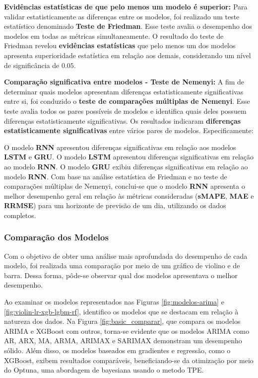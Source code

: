 \noindent\textbf{Evidências estatísticas de que pelo menos um modelo é superior:}
Para validar estatisticamente as diferenças entre os modelos, foi realizado um teste estatístico denominado \textbf{Teste de Friedman}. Esse teste avalia o desempenho dos modelos em todas as métricas simultaneamente. O resultado do teste de Friedman revelou \textbf{evidências estatísticas} que pelo menos um dos modelos apresenta superioridade estatística em relação aos demais, considerando um nível de significância de $0.05$.

\noindent\textbf{Comparação significativa entre modelos - Teste de Nemenyi:}	
A fim de determinar quais modelos apresentam diferenças estatisticamente significativas entre si, foi conduzido o \textbf{teste de comparações múltiplas de Nemenyi}. Esse teste avalia todos os pares possíveis de modelos e identifica quais deles possuem diferenças estatisticamente significativas. Os resultados indicaram \textbf{diferenças estatisticamente significativas} entre vários pares de modelos. Especificamente:

O modelo \textbf{RNN} apresentou diferenças significativas em relação aos modelos \textbf{LSTM} e \textbf{GRU}.
O modelo \textbf{LSTM} apresentou diferenças significativas em relação ao modelo \textbf{RNN}.
O modelo \textbf{GRU} exibiu diferenças significativas em relação ao modelo \textbf{RNN}.
Com base na análise estatística de Friedman e no teste de comparações múltiplas de Nemenyi, conclui-se que o modelo \textbf{RNN} apresenta o melhor desempenho geral em relação às métricas consideradas (\textbf{sMAPE}, \textbf{MAE} e \textbf{RRMSE}) para um horizonte de previsão de um dia, utilizando os dados completos.


\subsubsection{Compara\c c\~ao dos Modelos}

Com o objetivo de obter uma análise mais aprofundada do desempenho de cada modelo, foi realizada uma comparação por meio de um gráfico de violino e de barra. Dessa forma, pôde-se observar qual dos modelos apresentava o melhor desempenho.



Ao examinar os modelos representados nas Figuras \ref{fig:modelos-arima} e \ref{fig:violin-lr-xgb-lgbm-rf}, identifico os modelos que se destacam em relação à natureza dos dados. Na Figura \ref{fig:basic_comparar}, que compara os modelos ARIMA e XGBoost com outros, torna-se evidente que os modelos ARIMA como AR, ARX, MA, ARMA, ARIMAX e SARIMAX demonstram um desempenho sólido. Além disso, os modelos baseados em gradientes e regressão, como o XGBoost, exibem resultados comparáveis, beneficiando-se da otimização por meio do Optuna, uma abordagem de bayesiana usando o metodo TPE.

